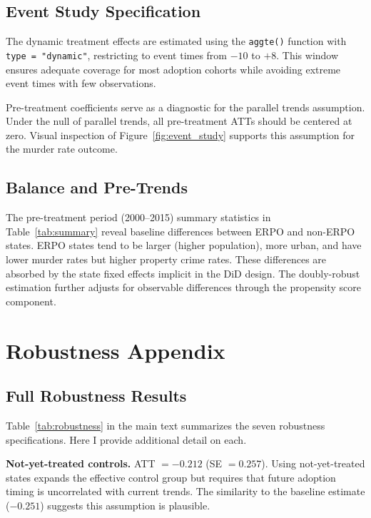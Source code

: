\documentclass[12pt]{article}
\begin{document}
\subsection{Event Study Specification}

The dynamic treatment effects are estimated using the \citet{callaway2021difference} \texttt{aggte()} function with \texttt{type = "dynamic"}, restricting to event times from $-10$ to $+8$. This window ensures adequate coverage for most adoption cohorts while avoiding extreme event times with few observations.

Pre-treatment coefficients serve as a diagnostic for the parallel trends assumption. Under the null of parallel trends, all pre-treatment ATTs should be centered at zero. Visual inspection of Figure~\ref{fig:event_study} supports this assumption for the murder rate outcome.

\subsection{Balance and Pre-Trends}

The pre-treatment period (2000--2015) summary statistics in Table~\ref{tab:summary} reveal baseline differences between ERPO and non-ERPO states. ERPO states tend to be larger (higher population), more urban, and have lower murder rates but higher property crime rates. These differences are absorbed by the state fixed effects implicit in the DiD design. The doubly-robust estimation further adjusts for observable differences through the propensity score component.


\section{Robustness Appendix}

\subsection{Full Robustness Results}

Table~\ref{tab:robustness} in the main text summarizes the seven robustness specifications. Here I provide additional detail on each.

\textbf{Not-yet-treated controls.} ATT $= -0.212$ (SE $= 0.257$). Using not-yet-treated states expands the effective control group but requires that future adoption timing is uncorrelated with current trends. The similarity to the baseline estimate ($-0.251$) suggests this assumption is plausible.
\end{document}

